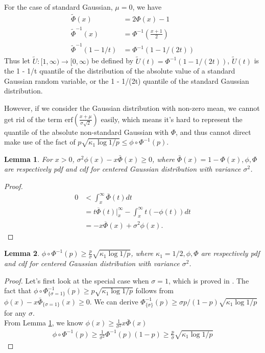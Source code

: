 \documentclass{article}
\theoremstyle{plain}
\newtheorem{lemma}{Lemma}
\begin{document}
For the case of standard Gaussian, $\mu = 0$,  we have
\begin{align}
    \tilde{\Phi}(x) &= 2 \Phi(x) - 1\\
    \tilde{\Phi}^{-1}(x) &= \Phi^{-1}(\frac{x+1}{2})\\
    \tilde{\Phi}^{-1}(1 - 1/t) &= \Phi^{-1}(1 - 1/(2t))
\end{align}
Thus let $\tilde{U} : [ 1, \infty ) \rightarrow[0, \infty)$ be defined by $\widetilde{U}(t)=\Phi^{-1}(1-1 /(2 t))$, $\widetilde{U}(t)$ is the 1 - 1/t quantile of the distribution of the absolute value of a standard Gaussian random variable, or the 1 - 1/(2t) quantile of the standard Gaussian distribution.

However, if we consider the Gaussian distribution with non-zero mean, we cannot get rid of the term $\text{erf}(\frac{x + \mu}{\sigma \sqrt{2}})$ easily, which means it's hard to represent the quantile of the absolute non-standard Gaussian with $\Phi$, and thus cannot direct make use of the fact of $p \sqrt{\kappa_{1} \log 1 / p} \leq \phi \circ \Phi^{-1}(p)$.


\begin{lemma}
\label{lemma mills' ratio}
    For $x >0$, $ \sigma^2 \phi(x) -x \bar{\Phi}(x) \geq 0$, where $\bar{\Phi}(x) = 1 - \Phi(x),  \phi, \Phi$ are respectively pdf and cdf for centered Gaussian distribution with variance $\sigma^2$.
\end{lemma}
\begin{proof}
\begin{align}
    0 &< \int_x^\infty \bar{\Phi}(t) dt\\
    & = t \overline{\Phi}\left.(t)\right|_{x} ^{\infty}-\int_x^{\infty} t(-\phi(t)) d t\\
    &= -x \overline{\Phi}(x)+ \sigma^2 \phi(x).
\end{align}
\end{proof}

\begin{lemma}
    $\phi \circ \Phi^{-1}(p) \geq \frac{p}{\sigma} \sqrt{\kappa_1 \log 1/p}$,  where $\kappa_{1} = 1 / 2, \phi, \Phi$ are respectively pdf and cdf for centered Gaussian distribution with variance $\sigma^2$.
\end{lemma}
\begin{proof}
Let's first look at the special case when $\sigma = 1$, which is proved in \cite{boucheron2012}. The fact that $\phi \circ \Phi_{\{\sigma = 1\}}^{-1}(p) \geq p \sqrt{\kappa_1 \log 1/p}$ follows from $\phi(x) - x \bar{\Phi}_{\{\sigma = 1\}}(x) \geq 0$. We can derive $\Phi_{\{\sigma\}}^{-1}(p) \geq \sigma p/(1-p) \sqrt{\kappa_1 \log 1/p}$ for any $\sigma$. \\

From Lemma \ref{lemma mills' ratio}, we know $ \phi(x) \geq \frac{1}{\sigma^2}x \bar{\Phi}(x)$
\begin{align}
    \phi \circ \Phi^{-1}(p) \geq \frac{1}{\sigma^2} \Phi^{-1}(p) (1-p) \geq \frac{p}{\sigma} \sqrt{\kappa_1 \log 1/p}
\end{align}
\end{proof}
\end{document}
